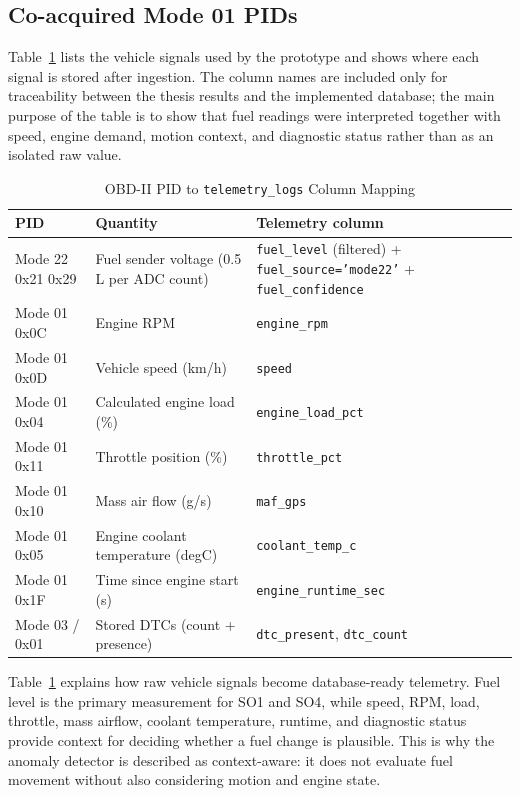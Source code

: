 \subsection{Co-acquired Mode 01 PIDs}

Table~\ref{tab:obd_pid_telemetry_mapping} lists the vehicle signals used by the prototype and shows where each signal is stored after ingestion. The column names are included only for traceability between the thesis results and the implemented database; the main purpose of the table is to show that fuel readings were interpreted together with speed, engine demand, motion context, and diagnostic status rather than as an isolated raw value.

\begin{table}[!htbp]
\centering
\caption{OBD-II PID to \texttt{telemetry\_logs} Column Mapping}
\label{tab:obd_pid_telemetry_mapping}
\scriptsize
\begin{tabular}{|p{}|p{}|p{}|}
\hline
\textbf{PID} & \textbf{Quantity} & \textbf{Telemetry column} \\
\hline
Mode 22 0x21 0x29 & Fuel sender voltage (0.5 L per ADC count) & \texttt{fuel\_level} (filtered) + \texttt{fuel\_source='mode22'} + \texttt{fuel\_confidence} \\
\hline
Mode 01 0x0C & Engine RPM & \texttt{engine\_rpm} \\
\hline
Mode 01 0x0D & Vehicle speed (km/h) & \texttt{speed} \\
\hline
Mode 01 0x04 & Calculated engine load (\%) & \texttt{engine\_load\_pct} \\
\hline
Mode 01 0x11 & Throttle position (\%) & \texttt{throttle\_pct} \\
\hline
Mode 01 0x10 & Mass air flow (g/s) & \texttt{maf\_gps} \\
\hline
Mode 01 0x05 & Engine coolant temperature (degC) & \texttt{coolant\_temp\_c} \\
\hline
Mode 01 0x1F & Time since engine start (s) & \texttt{engine\_runtime\_sec} \\
\hline
Mode 03 / 0x01 & Stored DTCs (count + presence) & \texttt{dtc\_present}, \texttt{dtc\_count} \\
\hline
\end{tabular}
\normalsize
\end{table}

Table~\ref{tab:obd_pid_telemetry_mapping} explains how raw vehicle signals become database-ready telemetry. Fuel level is the primary measurement for SO1 and SO4, while speed, RPM, load, throttle, mass airflow, coolant temperature, runtime, and diagnostic status provide context for deciding whether a fuel change is plausible. This is why the anomaly detector is described as context-aware: it does not evaluate fuel movement without also considering motion and engine state.


